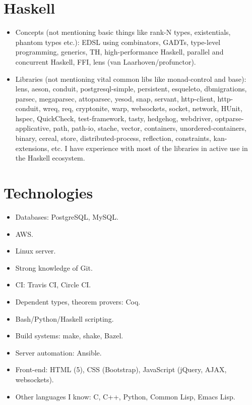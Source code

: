 \documentclass[a4paper,12pt]{article}
\begin{document}
\section*{Haskell}

\begin{itemize}[noitemsep]
\item Concepts (not mentioning basic things like rank-N types, existentials,
  phantom types etc.): EDSL using combinators, GADTs, type-level
  programming, generics, TH, high-performance Haskell, parallel and
  concurrent Haskell, FFI, lens (van Laarhoven/profunctor).
\item Libraries (not mentioning vital common libs like monad-control and
  base): lens, aeson, conduit, postgresql-simple, persistent, esqueleto,
  dbmigrations, parsec, megaparsec, attoparsec, yesod, snap, servant,
  http-client, http-conduit, wreq, req, cryptonite, warp, websockets,
  socket, network, HUnit, hspec, QuickCheck, test-framework, tasty,
  hedgehog, webdriver, optparse-applicative, path, path-io, stache, vector,
  containers, unordered-containers, binary, cereal, store,
  distributed-process, reflection, constraints, kan-extensions, etc. I have
  experience with most of the libraries in active use in the Haskell
  ecosystem.
\end{itemize}

\pagebreak

\section*{Technologies}

\begin{itemize}[noitemsep]
\item Databases: PostgreSQL, MySQL.
\item AWS.
\item Linux server.
\item Strong knowledge of Git.
\item CI: Travis CI, Circle CI.
\item Dependent types, theorem provers: Coq.
\item Bash/Python/Haskell scripting.
\item Build systems: make, shake, Bazel.
\item Server automation: Ansible.
\item Front-end: HTML (5), CSS (Bootstrap), JavaScript (jQuery, AJAX,
  websockets).
\item Other languages I know: C, C++, Python, Common Lisp, Emacs Lisp.
\end{itemize}
\end{document}
